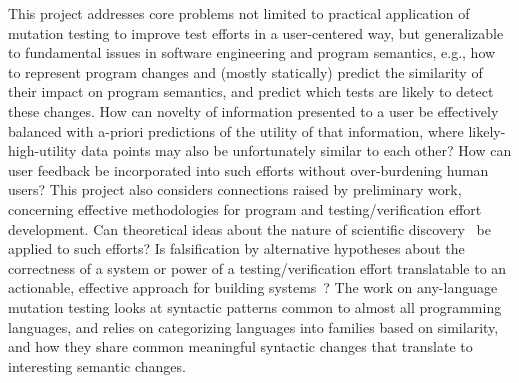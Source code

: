 This project addresses core problems not limited to practical application of mutation testing to improve test efforts in a user-centered way, but generalizable to fundamental issues in software engineering and program semantics, e.g., how to represent program changes and (mostly statically) predict the similarity of their impact on program semantics, and predict which tests are likely to detect these changes.  How can novelty of information presented to a user be effectively balanced with a-priori predictions of the utility of that information, where likely-high-utility data points may also be unfortunately similar to each other?  How can user feedback be incorporated into such efforts without over-burdening human users?  This project also considers connections raised by preliminary work, concerning effective methodologies for program and testing/verification effort development.  Can theoretical ideas about the nature of scientific discovery~\cite{Popper,popperconjectures,lakatos} be applied to such efforts?  Is falsification by alternative hypotheses about the correctness of a system or power of a testing/verification effort translatable to an actionable, effective approach for building systems~\cite{groce2015verified,groce2018verified}? 
The work on any-language mutation testing looks at syntactic patterns common to almost all programming languages, and relies on categorizing languages into families based on similarity, and how they share common meaningful syntactic changes that translate to interesting semantic changes.  